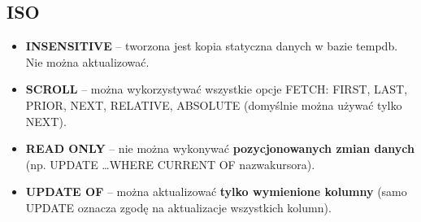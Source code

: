 \documentclass[a4paper]{article}
\begin{document}
    \subsection{ISO}
    \begin{itemize}[noitemsep]
        \item \textbf{INSENSITIVE} – tworzona jest kopia statyczna danych w bazie tempdb. Nie można aktualizować.
        \item \textbf{SCROLL} – można wykorzystywać wszystkie opcje FETCH: FIRST, LAST, PRIOR, NEXT, RELATIVE, ABSOLUTE
        (domyślnie można używać tylko NEXT).
        \item \textbf{READ ONLY} – nie można wykonywać \textbf{pozycjonowanych zmian danych} (np. UPDATE \dots WHERE
        CURRENT OF nazwakursora).
        \item \textbf{UPDATE OF} – można aktualizować \textbf{tylko wymienione kolumny} (samo UPDATE oznacza zgodę na
        aktualizacje wszystkich kolumn).
    \end{itemize}
\end{document}

